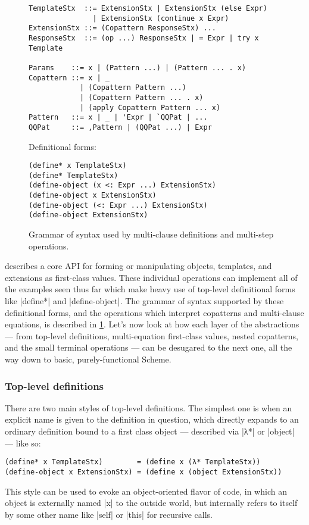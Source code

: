 \begin{figure}[t]
\centering

\begin{verbatim}
TemplateStx  ::= ExtensionStx | ExtensionStx (else Expr)
               | ExtensionStx (continue x Expr)
ExtensionStx ::= (Copattern ResponseStx) ...
ResponseStx  ::= (op ...) ResponseStx | = Expr | try x Template

Params    ::= x | (Pattern ...) | (Pattern ... . x)
Copattern ::= x | _
            | (Copattern Pattern ...)
            | (Copattern Pattern ... . x)
            | (apply Copattern Pattern ... x)
Pattern   ::= x | _ | 'Expr | `QQPat | ...
QQPat     ::= ,Pattern | (QQPat ...) | Expr
\end{verbatim}

Definitional forms:
\begin{verbatim}
(define* x TemplateStx)
(define* TemplateStx)
(define-object (x <: Expr ...) ExtensionStx)
(define-object x ExtensionStx)
(define-object (<: Expr ...) ExtensionStx)
(define-object ExtensionStx)
\end{verbatim}

\caption{Grammar of syntax used by multi-clause definitions and multi-step operations.}
\label{fig:macro-syntax}
\end{figure}

 describes a core API for forming or manipulating objects, templates, and extensions as first-class values.  These individual operations can implement all of the examples seen thus far which make heavy use of top-level definitional forms like \scm|define*| and \scm|define-object|.  The grammar of syntax supported by these definitional forms, and the operations which interpret copatterns and multi-clause equations, is described in \cref{fig:macro-syntax}.  Let's now look at how each layer of the abstractions --- from top-level definitions, multi-equation first-class values, nested copatterns, and the small terminal operations --- can be desugared to the next one, all the way down to basic, purely-functional Scheme.

\subsubsection{Top-level definitions}

There are two main styles of top-level definitions.  The simplest one is when an explicit name is given to the definition in question, which directly expands to an ordinary definition bound to a first class object --- described via \scm|λ*| or \scm|object| --- like so:
\begin{verbatim}
(define* x TemplateStx)        = (define x (λ* TemplateStx))
(define-object x ExtensionStx) = (define x (object ExtensionStx))
\end{verbatim}
This style can be used to evoke an object-oriented flavor of code, in which an object is externally named \scm|x| to the outside world, but internally refers to itself by some other name like \scm|self| or \scm|this| for recursive calls.

